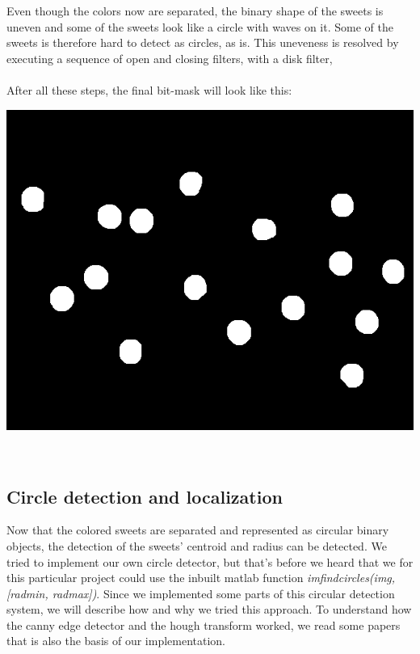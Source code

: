 Even though the colors now are separated, the binary shape of the sweets is uneven and some of the sweets look like a circle with waves on it. Some of the sweets is therefore hard to detect as circles, as is. This uneveness is resolved by executing a sequence of open and closing filters, with a disk filter,
\\

\mbox{}\\
After all these steps, the final bit-mask will look like this:
\\ \newline
\centerline{\includegraphics[scale=0.3]{../results/sweetsA03_blue_sweets.png}}
\mbox{}\\
\subsection{Circle detection and localization}
Now that the colored sweets are separated and represented as circular binary objects, the detection of the sweets' centroid and radius can be detected. We tried to implement our own circle detector, but that's before we heard that we \-for this particular project \- could use the inbuilt matlab function \emph{imfindcircles(img, [radmin, radmax])}. Since we implemented some parts of this circular detection system, we will describe how and why we tried this approach. To understand how the canny edge detector and the hough transform worked, we read some papers \cite{canny1,hough1} that is also the basis of our implementation.
